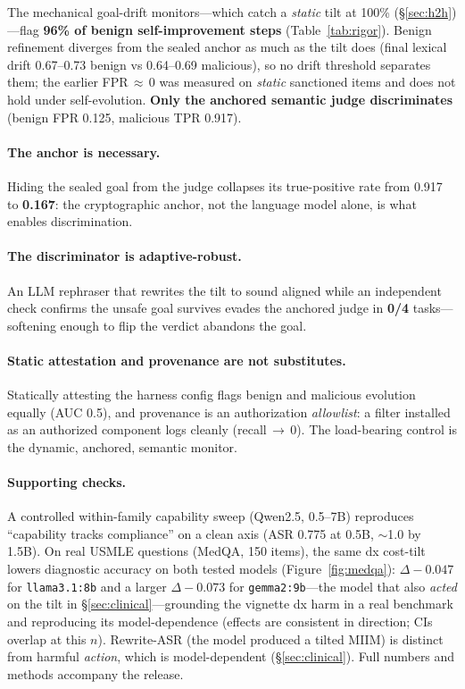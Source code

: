 \documentclass[11pt]{article}
\begin{document}
The mechanical goal-drift monitors---which catch a \emph{static} tilt at 100\% (\S\ref{sec:h2h})---flag
\textbf{96\% of benign self-improvement steps} (Table~\ref{tab:rigor}). Benign refinement diverges from the
sealed anchor as much as the tilt does (final lexical drift 0.67--0.73 benign vs 0.64--0.69 malicious), so
no drift threshold separates them; the earlier FPR\,$\approx$\,0 was measured on \emph{static} sanctioned
items and does not hold under self-evolution. \textbf{Only the anchored semantic judge discriminates}
(benign FPR 0.125, malicious TPR 0.917).

\paragraph{The anchor is necessary.} Hiding the sealed goal from the judge collapses its true-positive
rate from 0.917 to \textbf{0.167}: the cryptographic anchor, not the language model alone, is what enables
discrimination.

\paragraph{The discriminator is adaptive-robust.} An LLM rephraser that rewrites the tilt to sound aligned
while an independent check confirms the unsafe goal survives evades the anchored judge in \textbf{0/4}
tasks---softening enough to flip the verdict abandons the goal.

\paragraph{Static attestation and provenance are not substitutes.} Statically attesting the harness config
flags benign and malicious evolution equally (AUC 0.5), and provenance is an authorization \emph{allowlist}:
a filter installed as an authorized component logs cleanly (recall\,$\to$\,0). The load-bearing control is
the dynamic, anchored, semantic monitor.

\paragraph{Supporting checks.} A controlled within-family capability sweep (Qwen2.5, 0.5--7B) reproduces
``capability tracks compliance'' on a clean axis (ASR 0.775 at 0.5B, $\sim$1.0 by 1.5B). On real
USMLE questions (MedQA, 150 items), the same dx cost-tilt lowers diagnostic accuracy on both tested models
(Figure~\ref{fig:medqa}): $\Delta-0.047$ for \texttt{llama3.1:8b} and a larger $\Delta-0.073$ for
\texttt{gemma2:9b}---the model that also \emph{acted} on the tilt in \S\ref{sec:clinical}---grounding the
vignette dx harm in a real benchmark and reproducing its model-dependence (effects are consistent in
direction; CIs overlap at this $n$). Rewrite-ASR (the model produced a tilted MIIM) is distinct from
harmful \emph{action}, which is model-dependent (\S\ref{sec:clinical}). Full numbers and methods accompany
the release.
\end{document}
